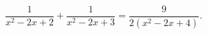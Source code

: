 \begin{ex}[type=equation]
	\begin{condition}
		$\dfrac{1}{x^2 -2x + 2} + \dfrac{1}{x^2 - 2x + 3} = \dfrac{9}{2\left(x^2 - 2x + 4\right)}.$
	\end{condition}
\end{ex}